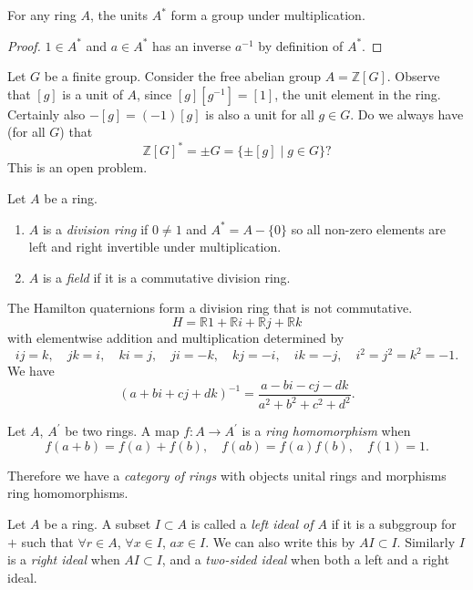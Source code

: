 \begin{prop}
For any ring $A$, the units $A^\ast$ form a group under multiplication.
\end{prop}
\begin{proof}
$1 \in A^\ast$ and $a \in A^\ast$ has an inverse $a^{-1}$ by
definition of $A^\ast$.
\end{proof}

Let $G$ be a finite group. Consider the free abelian group
$A = \mathbb{Z}[G]$. Observe that $[g]$ is a unit of $A$, since
$[g] [g^{-1}] = [1]$, the unit element in the ring. Certainly also
$-[g] = (-1)[g]$ is also a unit for all $g \in G$. Do we always
have (for all $G$) that
$$
\mathbb{Z}[G]^\ast = \pm G = \{ \pm [g] \mid g \in G \}?
$$
This is an open problem.

\begin{defn}
Let $A$ be a ring.
\begin{enumerate}
  \item{
    $A$ is a \emph{division ring} if $0 \neq 1$ and
    $A^\ast = A - \{ 0 \}$ so all non-zero elements are left and right
    invertible under multiplication.
  }
  \item{
    $A$ is a \emph{field} if it is a commutative division ring.
  }
\end{enumerate}
\end{defn}

\begin{xmpl}
The Hamilton quaternions form a division ring that is not commutative.
$$
H = \mathbb{R} 1 + \mathbb{R} i + \mathbb{R} j + \mathbb{R} k
$$
with elementwise addition and multiplication determined by
$$
ij = k, \quad
jk = i, \quad
ki = j, \quad
ji = -k, \quad
kj = -i, \quad
ik = -j, \quad
i^2 = j^2 = k^2 = -1.
$$
We have
$$
(a + bi + cj + dk)^{-1} =
\frac{a - bi - cj - dk}{a^2 + b^2 + c^2 + d^2}.
$$
\end{xmpl}

\begin{defn}
Let $A$, $A^\prime$ be two rings. A map $f: A \to A^\prime$ is a
\emph{ring homomorphism} when
$$
f(a + b) = f(a) + f(b), \quad
f(a b) = f(a) f(b), \quad
f(1) = 1.
$$
\end{defn}

Therefore we have a \emph{category of rings} with objects unital rings and morphisms
ring homomorphisms.

\begin{defn}[Ideal]
Let $A$ be a ring. A subset $I \subset A$ is called a
\emph{left ideal of $A$} if it is a subggroup for $+$ such that
$\forall r \in A$, $\forall x \in I$, $a x \in I$. We can also write
this by $AI \subset I$. Similarly $I$ is a \emph{right ideal}
when $AI \subset I$, and a \emph{two-sided ideal} when both a
left and a right ideal.
\end{defn}

